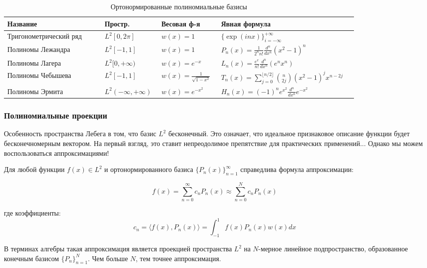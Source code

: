 \documentclass[11pt]{extarticle}
\begin{document}
\begin{table}[h]
\centering
\small
\renewcommand{\arraystretch}{2.5}
\begin{tabular}{m{0.26\linewidth}|>{\centering\arraybackslash}m{0.12\linewidth}|>{\centering\arraybackslash}m{0.15\linewidth}|>{\centering\arraybackslash}m{0.3\linewidth}}
\textbf{Название} & \textbf{Простр.} & \textbf{Весовая ф-я} & \textbf{Явная формула} \\
\hline
Тригонометрический ряд & $L^2[0, 2\pi]$ & $w(x)=1$ & $\displaystyle\{\exp(inx)\}_{i=-\infty}^{+\infty}$ \\
\hline
Полиномы Лежандра & $L^2[-1,1]$ & $w(x)=1$ & $\displaystyle P_n(x)=\frac{1}{2^nn!}\frac{d^n}{dx^n}(x^2-1)^n$ \\
\hline
Полиномы Лагера & $L^2[0,+\infty)$ & $w(x)=e^{-x}$ & $\displaystyle L_n(x)=\frac{e^x}{n!}\frac{d^n}{dx^n}(e^n x^n)$ \\
\hline
Полиномы Чебышева & $L^2[-1,1]$ & $\displaystyle w(x)=\frac{1}{\sqrt{1-x^2}}$ & $\displaystyle T_n(x)=\sum_{j=0}^{\lfloor n/2\rfloor}\binom{n}{2j}(x^2-1)^jx^{n-2j}$ \\
\hline
Полиномы Эрмита & $L^2(-\infty,+\infty)$ & $w(x)=e^{-x^2}$ & $\displaystyle H_n(x)=(-1)^ne^{x^2}\frac{d^n}{dx^n}e^{-x^2}$ \\
\end{tabular}
\caption{Ортонормированные полиномиальные базисы}
\end{table}

\subsubsection{Полиномиальные проекции}

Особенность пространства Лебега в том, что базис $L^2$ бесконечный. Это означает, что идеальное признаковое описание функции будет бесконечномерным вектором. На первый взгляд, это ставит непреодолимое препятствие для практических применений... Однако мы можем воспользоваться аппроксимациями!

Для любой функции $f(x) \in L^2$ и ортонормированного базиса $\{P_n(x)\}_{n=1}^\infty$ справедлива формула аппроксимации:

$$f(x) = \sum_{n=0}^\infty c_n P_n(x) \approx \sum_{n=0}^N c_n P_n(x)$$

где коэффициенты:
$$c_n = \langle f(x), P_n(x) \rangle = \int_{-1}^1 f(x)P_n(x)w(x)dx$$

В терминах алгебры такая аппроксимация является проекцией пространства $L^2$ на $N$-мерное линейное подпространство, образованное конечным базисом $\{P_n\}_{n=1}^N$. Чем больше $N$, тем точнее аппроксимация. 
\end{document}
